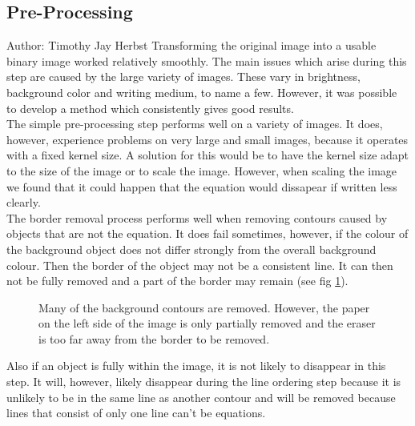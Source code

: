 \documentclass[12pt]{article}
\begin{document}
	\subsection{Pre-Processing}
	\small{Author: Timothy Jay Herbst} \newline \newline
	Transforming the original image into a usable binary image worked relatively smoothly.
	The main issues which arise during this step are caused by the large variety of images.
	These vary in brightness, background color and writing medium, to name a few.
	However, it was possible to develop a method which consistently gives good results.\\
	The simple pre-processing step performs well on a variety of images.
	It does, however, experience problems on very large and small images, because it operates with a fixed kernel size.
	A solution for this would be to have the kernel size adapt to the size of the image or to scale the image.
	However, when scaling the image we found that it could happen that the equation would dissapear if written less clearly.\\
	The border removal process performs well when removing contours caused by objects that are not the equation.
	It does fail sometimes, however, if the colour of the background object does not differ strongly from the overall background colour.
	Then the border of the object may not be a consistent line.
	It can then not be fully removed and a part of the border may remain (see fig \ref{fig:PartialBorder}).
	\begin{figure}[htp]
		\centering
		\quad%
		
		\caption{Many of the background contours are removed.
		However, the paper on the left side of the image is only partially removed and the eraser is too far away from the border to be removed.}
		\label{fig:PartialBorder}
	\end{figure}
	Also if an object is fully within the image, it is not likely to disappear in this step.
	It will, however, likely disappear during the line ordering step because it is unlikely to be in the same line as another contour and will be removed because lines that consist of only one line can't be equations.\\
	
\end{document}
